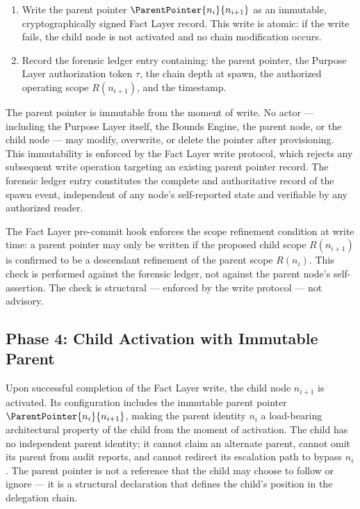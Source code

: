 \begin{enumerate}
  \item Write the parent pointer $\ParentPointer{n_i}{n_{i+1}}$ as an immutable, cryptographically signed Fact Layer record. This write is atomic: if the write fails, the child node is not activated and no chain modification occurs.
  \item Record the forensic ledger entry containing: the parent pointer, the Purpose Layer authorization token $\tau$, the chain depth at spawn, the authorized operating scope $R(n_{i+1})$, and the timestamp.
\end{enumerate}

The parent pointer is immutable from the moment of write. No actor — including the Purpose Layer itself, the Bounds Engine, the parent node, or the child node — may modify, overwrite, or delete the pointer after provisioning. This immutability is enforced by the Fact Layer write protocol, which rejects any subsequent write operation targeting an existing parent pointer record. The forensic ledger entry constitutes the complete and authoritative record of the spawn event, independent of any node's self-reported state and verifiable by any authorized reader.

The Fact Layer pre-commit hook enforces the scope refinement condition at write time: a parent pointer may only be written if the proposed child scope $R(n_{i+1})$ is confirmed to be a descendant refinement of the parent scope $R(n_i)$. This check is performed against the forensic ledger, not against the parent node's self-assertion. The check is structural — enforced by the write protocol — not advisory.

\subsection{Phase 4: Child Activation with Immutable Parent}

Upon successful completion of the Fact Layer write, the child node $n_{i+1}$ is activated. Its configuration includes the immutable parent pointer $\ParentPointer{n_i}{n_{i+1}}$, making the parent identity $n_i$ a load-bearing architectural property of the child from the moment of activation. The child has no independent parent identity; it cannot claim an alternate parent, cannot omit its parent from audit reports, and cannot redirect its escalation path to bypass $n_i$. The parent pointer is not a reference that the child may choose to follow or ignore — it is a structural declaration that defines the child's position in the delegation chain.

